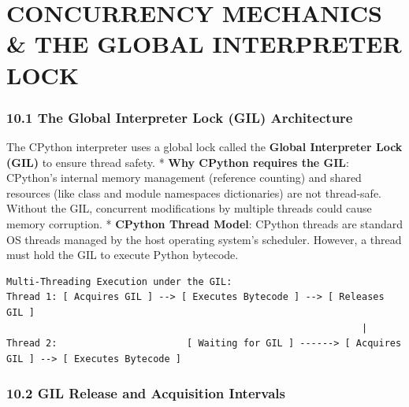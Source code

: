 \hypertarget{concurrency-mechanics-the-global-interpreter-lock}{%
\chapter{CONCURRENCY MECHANICS \& THE GLOBAL INTERPRETER
LOCK}\label{concurrency-mechanics-the-global-interpreter-lock}}

\hypertarget{the-global-interpreter-lock-gil-architecture}{%
\subsection{10.1 The Global Interpreter Lock (GIL)
Architecture}\label{the-global-interpreter-lock-gil-architecture}}

The CPython interpreter uses a global lock called the \textbf{Global
Interpreter Lock (GIL)} to ensure thread safety. * \textbf{Why CPython
requires the GIL}: CPython's internal memory management (reference
counting) and shared resources (like class and module namespaces
dictionaries) are not thread-safe. Without the GIL, concurrent
modifications by multiple threads could cause memory corruption. *
\textbf{CPython Thread Model}: CPython threads are standard OS threads
managed by the host operating system's scheduler. However, a thread must
hold the GIL to execute Python bytecode.

\begin{lstlisting}
Multi-Threading Execution under the GIL:
Thread 1: [ Acquires GIL ] --> [ Executes Bytecode ] --> [ Releases GIL ]
                                                               |
Thread 2:                       [ Waiting for GIL ] ------> [ Acquires GIL ] --> [ Executes Bytecode ]
\end{lstlisting}

\hypertarget{gil-release-and-acquisition-intervals}{%
\subsection{10.2 GIL Release and Acquisition
Intervals}\label{gil-release-and-acquisition-intervals}}


